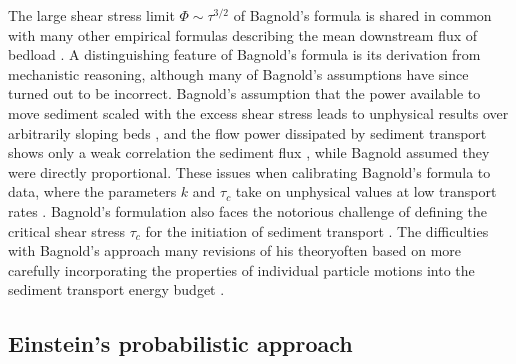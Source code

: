 The large shear stress limit $\Phi \sim \tau^{3/2}$ of Bagnold's formula is shared in common with many other empirical formulas describing the mean downstream flux of bedload \citep[e.g.][]{MeyerPeter1948, Yalin1972, Wilcock2003, Parker1990}. A distinguishing feature of Bagnold's formula is its derivation from mechanistic reasoning, although many of Bagnold's assumptions have since turned out to be incorrect.
Bagnold's assumption that the power available to move sediment scaled with the excess shear stress leads to unphysical results over arbitrarily sloping beds \citep{Seminara2002}, and the flow power dissipated by sediment transport shows only a weak correlation \DIFaddbegin {}\DIFaddend the sediment flux \citep{Ancey2008}, while Bagnold assumed they were directly proportional. These issues \DIFdelbegin {}\DIFdelend \DIFaddbegin {}\DIFaddend when calibrating Bagnold's formula to data, where the parameters $k$ and $\tau_c$ take on unphysical values at low transport rates \citep{Nino1996}.
Bagnold's formulation also faces the notorious challenge of defining the critical shear stress $\tau_c$ for the initiation of sediment transport \citep{Paintal1971,Kirchener1990,Houssais2015,Clark2017,Allen2018}.
The difficulties with Bagnold's approach \DIFdelbegin {}\DIFdelend \DIFaddbegin {}\DIFaddend many revisions of his theory\DIFdelbegin \DIFdel{, }\DIFdelend \DIFaddbegin {}\DIFaddend often based on more carefully incorporating the properties of individual particle motions into the sediment transport energy budget \citep{Engelund1976,Luque1976,Nino1998,Martin2000}.

\subsection{Einstein's probabilistic approach}
\label{sec:einflux}

